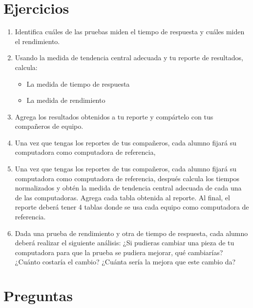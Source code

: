 \documentclass{article}
\begin{document}
\section{Ejercicios}

\begin{enumerate}
\item Identifica cuáles de las pruebas miden el tiempo de respuesta y cuáles miden el rendimiento.
\item Usando la medida de tendencia central adecuada y tu reporte de resultados, calcula:
\begin{itemize}
\item La medida de tiempo de respuesta
\item La medida de rendimiento
\end{itemize}
\item Agrega los resultados obtenidos a tu reporte y compártelo con tus compañeros de equipo.
\item Una vez que tengas los reportes de tus compañeros, cada alumno fijará su computadora como computadora de referencia,
\item Una vez que tengas los reportes de tus compañeros, cada alumno fijará su computadora como computadora de referencia, después calcula los tiempos normalizados y obtén la medida de tendencia central adecuada de cada una de las computadoras. Agrega cada tabla obtenida al reporte. Al final, el reporte deberá tener 4 tablas donde se usa cada equipo como computadora de referencia.
\item Dada una prueba de rendimiento y otra de tiempo de respuesta, cada alumno deberá realizar el siguiente análisis: ¿Si pudieras cambiar una pieza de tu computadora para que la prueba se pudiera mejorar, qué cambiarías? ¿Cuánto costaría el cambio? ¿Cuánta sería la mejora que este cambio da?
\end{enumerate}

\section{Preguntas}
\end{document}

